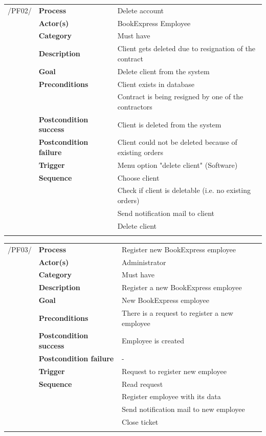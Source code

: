 \documentclass[11pt,a4paper,oneside,svgnames]{report}
\begin{document}
\noindent
\begin{tabular}{p{1.5cm}p{3cm}p{8cm}}
/PF02/	& \textbf{Process} & Delete account\\ 
		& \textbf{Actor(s)} & BookExpress Employee\\ 
		& \textbf{Category} & Must have\\
		& \textbf{Description}	 & Client gets deleted due to resignation of the contract\\ 
		& \textbf{Goal} & Delete client from the system\\
		& \textbf{Preconditions} & Client exists in database\\
		& & Contract is being resigned by one of the contractors\\
		& \textbf{Postcondition success} & Client is deleted from the system\\
		& \textbf{Postcondition failure} & Client could not be deleted because of existing orders\\
		& \textbf{Trigger} & Menu option "delete client" (Software)\\
		& \textbf{Sequence} & Choose client\\
		& & Check if client is deletable (i.e. no existing orders)\\
		& & Send notification mail to client\\
		& & Delete client\\
\hfill \\		
\end{tabular}

\noindent
\begin{tabular}{p{1.5cm}p{3cm}p{8cm}}
/PF03/	& \textbf{Process} & Register new BookExpress employee\\ 
		& \textbf{Actor(s)} & Administrator\\ 
		& \textbf{Category} & Must have\\
		& \textbf{Description}	 & Register a new BookExpress employee\\ 
		& \textbf{Goal} & New BookExpress employee\\
		& \textbf{Preconditions} & There is a request to register a new employee\\
		& \textbf{Postcondition success} & Employee is created\\
		& \textbf{Postcondition failure} & -\\
		& \textbf{Trigger} & Request to register new employee\\
		& \textbf{Sequence} & Read request\\
		& & Register employee with its data\\
		& & Send notification mail to new employee\\
		& & Close ticket\\
\hfill \\		
\end{tabular}
\end{document}
